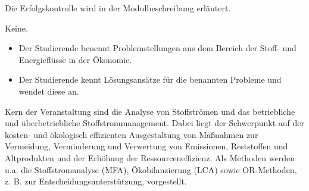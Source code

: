 \begin{course}

\setdoclanguagegerman
{}



\coursehead


\label{cour_6615.dp_997}


\begin{styleenv}
\begin{assessment}
Die Erfolgskontrolle wird in der Modulbeschreibung erläutert.


\end{assessment}

\begin{conditions}Keine.\end{conditions}


\end{styleenv}

\begin{learningoutcomes}
\begin{itemize}\item Der Studierende benennt Problemstellungen aus dem Bereich der Stoff- und Energieflüsse in der Ökonomie.  \item Der Studierende kennt Lösungsansätze für die benannten Probleme und wendet diese an.  \end{itemize}
\end{learningoutcomes}

\begin{content}
Kern der Veranstaltung sind die Analyse von Stoffströmen und das betriebliche und überbetriebliche Stoffstrommanagement. Dabei liegt der Schwerpunkt auf der kosten- und ökologisch effizienten Ausgestaltung von Maßnahmen zur Vermeidung, Verminderung und Verwertung von Emissionen, Reststoffen und Altprodukten und der Erhöhung der Ressourceneffizienz. Als Methoden werden u.a. die Stoffstromanalyse (MFA), Ökobilanzierung (LCA) sowie OR-Methoden, z. B. zur Entscheidungsunterstützung, vorgestellt.


\end{content}
\end{course}
